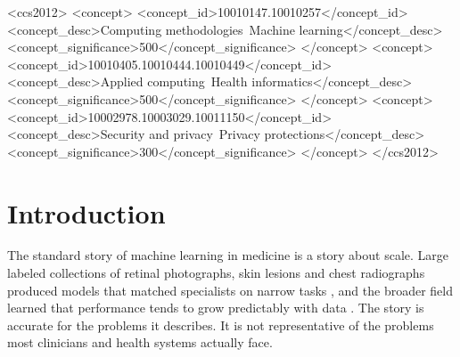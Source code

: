 \documentclass[acmsmall,screen,review]{acmart}
\theoremstyle{acmdefinition}
\begin{document}
\begin{CCSXML}
<ccs2012>
   <concept>
       <concept_id>10010147.10010257</concept_id>
       <concept_desc>Computing methodologies~Machine learning</concept_desc>
       <concept_significance>500</concept_significance>
       </concept>
   <concept>
       <concept_id>10010405.10010444.10010449</concept_id>
       <concept_desc>Applied computing~Health informatics</concept_desc>
       <concept_significance>500</concept_significance>
       </concept>
   <concept>
       <concept_id>10002978.10003029.10011150</concept_id>
       <concept_desc>Security and privacy~Privacy protections</concept_desc>
       <concept_significance>300</concept_significance>
       </concept>
 </ccs2012>
\end{CCSXML}



\maketitle
\renewcommand{\shortauthors}{Sim\~{o}es et al.}

\section{Introduction}\label{sec:intro}

The standard story of machine learning in medicine is a story about scale. Large labeled collections of retinal photographs, skin lesions and chest radiographs produced models that matched specialists on narrow tasks \cite{rajpurkar2022ai,topol2019high}, and the broader field learned that performance tends to grow predictably with data \cite{halevy2009unreasonable,hestness2017deep,kaplan2020scaling,sun2017revisiting}. The story is accurate for the problems it describes. It is not representative of the problems most clinicians and health systems actually face.
\end{document}
